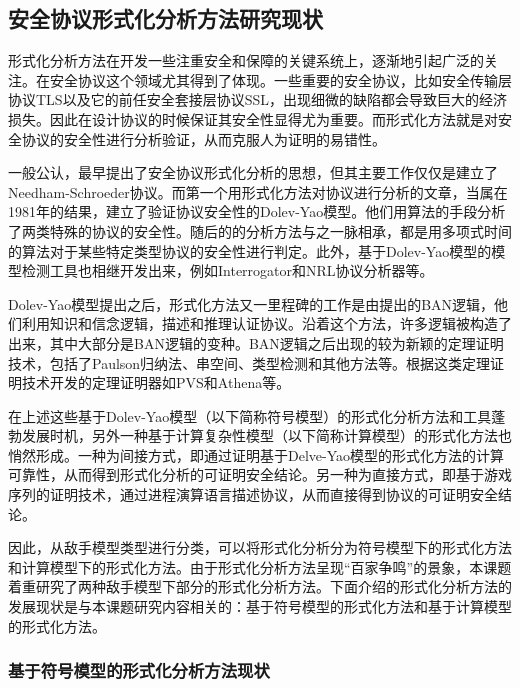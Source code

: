 \subsection{安全协议形式化分析方法研究现状}

形式化分析方法在开发一些注重安全和保障的关键系统上，逐渐地引起广泛的关注。在安全协议这个领域尤其得到了体现。一些重要的安全协议，比如安全传输层协议TLS以及它的前任安全套接层协议SSL，出现细微的缺陷都会导致巨大的经济损失。因此在设计协议的时候保证其安全性显得尤为重要。而形式化方法就是对安全协议的安全性进行分析验证，从而克服人为证明的易错性。

一般公认，\citet{needham1978using}最早提出了安全协议形式化分析的思想，但其主要工作仅仅是建立了Needham-Schroeder协议。而第一个用形式化方法对协议进行分析的文章，当属\citet{dolev1981security}在1981年的结果，建立了验证协议安全性的Dolev-Yao模型。他们用算法的手段分析了两类特殊的协议的安全性。随后的\citet{dolev1983security}的分析方法与之一脉相承，都是用多项式时间的算法对于某些特定类型协议的安全性进行判定。此外，基于Dolev-Yao模型的模型检测工具也相继开发出来，例如Interrogator\citep{millen1987interrogator}和NRL协议分析器\citep{meadows1994model}等。

Dolev-Yao模型提出之后，形式化方法又一里程碑的工作是由\citet{burrows1989logic}提出的BAN逻辑，他们利用知识和信念逻辑，描述和推理认证协议。沿着这个方法，许多逻辑被构造了出来，其中大部分是BAN逻辑的变种。BAN逻辑之后出现的较为新颖的定理证明技术，包括了Paulson归纳法\citep{paulson1998inductive}、串空间\citep{fabrega1998strand}、类型检测\citep{abadi1999secrecy, gordon2003authenticity}和其他方法\citep{kemmerer1994three,dutertre1997using}等。根据这类定理证明技术开发的定理证明器如PVS\citep{owre1992pvs}和Athena\citep{song2001athena}等。

在上述这些基于Dolev-Yao模型（以下简称符号模型）的形式化分析方法和工具蓬勃发展时机，另外一种基于计算复杂性模型（以下简称计算模型）的形式化方法也悄然形成。一种为间接方式，即通过证明基于Delve-Yao模型的形式化方法的计算可靠性，从而得到形式化分析的可证明安全结论。另一种为直接方式，即基于游戏序列的证明技术，通过进程演算语言描述协议，从而直接得到协议的可证明安全结论。

因此，从敌手模型类型进行分类，可以将形式化分析分为符号模型下的形式化方法和计算模型下的形式化方法。由于形式化分析方法呈现“百家争鸣”的景象，本课题着重研究了两种敌手模型下部分的形式化分析方法。下面介绍的形式化分析方法的发展现状是与本课题研究内容相关的：基于符号模型的形式化方法和基于计算模型的形式化方法。

\subsubsection{基于符号模型的形式化分析方法现状}

